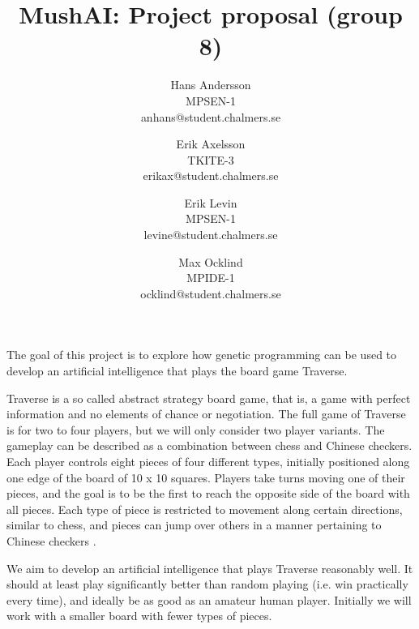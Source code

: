 \documentclass[times, 10pt,twocolumn]{article}
\begin{document}
\title{MushAI: Project proposal (group 8)}

\author{Hans Andersson\\
MPSEN-1\\anhans@student.chalmers.se\\
\and
Erik Axelsson\\
TKITE-3\\
erikax@student.chalmers.se\\
\and
Erik Levin\\
MPSEN-1\\
levine@student.chalmers.se
\and
Max Ocklind\\
MPIDE-1\\
ocklind@student.chalmers.se
}

\maketitle
\thispagestyle{empty}



The goal of this project is to explore how genetic programming can be used to develop an artificial intelligence that plays the board game Traverse.

Traverse is a so called abstract strategy board game, that is, a game with perfect information and no elements of chance or negotiation. The full game of Traverse is for two to four players, but we will only consider two player variants. The gameplay can be described as a combination between chess and Chinese checkers. Each player controls eight pieces of four different types, initially positioned along one edge of the board of 10 x 10 squares. Players take turns moving one of their pieces, and the goal is to be the first to reach the opposite side of the board with all pieces. Each type of piece is restricted to movement along certain directions, similar to chess, and pieces can jump over others in a manner pertaining to Chinese checkers \cite{rules}.



We aim to develop an artificial intelligence that plays Traverse reasonably well. It should at least play significantly better than random playing (i.e. win practically every time), and ideally be as good as an amateur human player. Initially we will work with a smaller board with fewer types of pieces.
\end{document}
